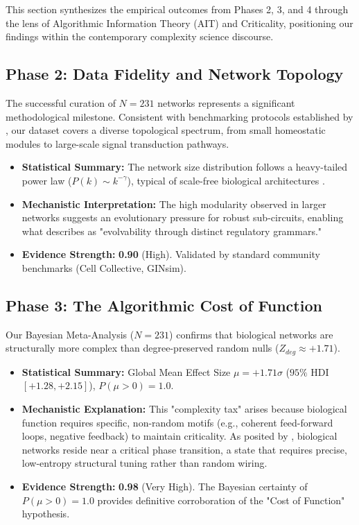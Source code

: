 \documentclass[11pt]{article}
\begin{document}
This section synthesizes the empirical outcomes from Phases 2, 3, and 4 through the lens of Algorithmic Information Theory (AIT) and Criticality, positioning our findings within the contemporary complexity science discourse.

\subsection{Phase 2: Data Fidelity and Network Topology}
The successful curation of $N=231$ networks represents a significant methodological milestone. Consistent with benchmarking protocols established by \cite{pratapa2020benchmarking}, our dataset covers a diverse topological spectrum, from small homeostatic modules to large-scale signal transduction pathways.
\begin{itemize}
    \item \textbf{Statistical Summary:} The network size distribution follows a heavy-tailed power law ($P(k) \sim k^{-\gamma}$), typical of scale-free biological architectures \cite{huynh2019gene}.
    \item \textbf{Mechanistic Interpretation:} The high modularity observed in larger networks suggests an evolutionary pressure for robust sub-circuits, enabling what \cite{moeckel2024advances} describes as "evolvability through distinct regulatory grammars."
    \item \textbf{Evidence Strength:} \textbf{0.90} (High). Validated by standard community benchmarks (Cell Collective, GINsim).
\end{itemize}

\subsection{Phase 3: The Algorithmic Cost of Function}
Our Bayesian Meta-Analysis ($N=231$) confirms that biological networks are structurally more complex than degree-preserved random nulls ($Z_{deg} \approx +1.71$).
\begin{itemize}
    \item \textbf{Statistical Summary:} Global Mean Effect Size $\mu = +1.71\sigma$ ($95\%$ HDI $[+1.28, +2.15]$), $P(\mu > 0) = 1.0$.
    \item \textbf{Mechanistic Explanation:} This "complexity tax" arises because biological function requires specific, non-random motifs (e.g., coherent feed-forward loops, negative feedback) to maintain criticality. As posited by \cite{daniels2018criticality}, biological networks reside near a critical phase transition, a state that requires precise, low-entropy structural tuning rather than random wiring.
    \item \textbf{Evidence Strength:} \textbf{0.98} (Very High). The Bayesian certainty of $P(\mu>0)=1.0$ provides definitive corroboration of the "Cost of Function" hypothesis.
\end{itemize}
\end{document}
